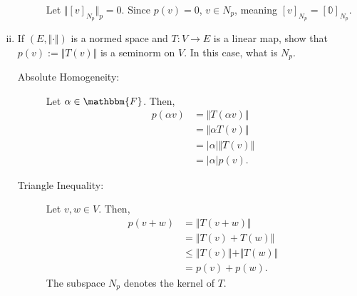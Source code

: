 \documentclass[10pt]{extarticle}
\begin{document}
\begin{enumerate}[(i)]
\begin{description}
          Let $\Vert [v]_{N_p}\Vert_{p} = 0$. Since $p(v) = 0$, $v\in N_{p}$, meaning $[v]_{N_p} = [\mathbb{0}]_{N_p}$.
      \end{description}
    \item If $(E,\Vert\cdot\Vert)$ is a normed space and $T: V\rightarrow E$ is a linear map, show that $p(v) := \Vert T(v)\Vert$ is a seminorm on $V$. In this case, what is $N_p$.
      \begin{description}
        \item[Absolute Homogeneity:] Let $\alpha\in \mathbbm{F}$. Then,
          \begin{align*}
            p(\alpha v) &= \Vert T(\alpha v)\Vert\\
                        &= \Vert \alpha T(v)\Vert\\
                        &= |\alpha|\Vert T(v)\Vert\\
                        &= |\alpha| p(v).
          \end{align*}
        \item[Triangle Inequality:] Let $v,w\in V$. Then,
          \begin{align*}
            p(v + w) &= \Vert T(v+w)\Vert\\
                     &= \Vert T(v) + T(w)\Vert\\
                     &\leq \Vert T(v)\Vert + \Vert T(w)\Vert\\
                     &= p(v) + p(w).
          \end{align*}
          The subspace $N_p$ denotes the kernel of $T$.
      \end{description}
  \end{enumerate}
\end{document}
